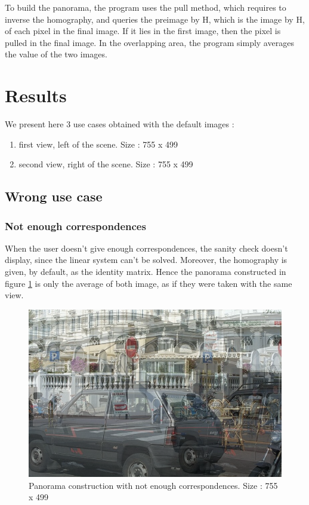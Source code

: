 \documentclass[12pt,a4paper,onecolumn]{article}
\begin{document}
To build the panorama, the program uses the pull method, which requires to inverse the homography, and queries the preimage by H, which is the image by H, of each pixel in the final image. If it lies in the first image, then the pixel is pulled in the final image. In the overlapping area, the program simply averages the value of the two images.

\section{Results}
We present here 3 use cases obtained with the default images :
\begin{enumerate}
\item first view, left of the scene. Size : 755 x 499
\item second view, right of the scene. Size : 755 x 499
\end{enumerate}

\subsection{Wrong use case}

\subsubsection{Not enough correspondences}

When the user doesn't give enough correspondences, the sanity check doesn't display, since the linear system can't be solved. Moreover, the homography is given, by default, as the identity matrix. Hence the panorama constructed in figure \ref{not_enough} is only the average of both image, as if they were taken with the same view.
\begin{figure}[H]
\begin{center}
\includegraphics[width = \textwidth]{panorama_not_enough.png}
\end{center}
\caption{Panorama construction with not enough correspondences. Size : 755 x 499}
\label{not_enough}
\end{figure}
\end{document}
